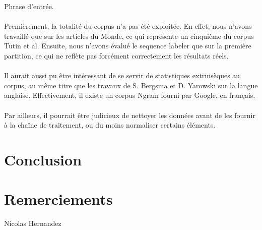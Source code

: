 \documentclass[a4paper,12pt]{article}
\begin{document}
Phrase d'entrée.

\paragraph{}
Premièrement, la totalité du corpus n'a pas été exploitée. En effet, nous n'avons travaillé que sur les articles du Monde, ce qui représente un cinquième du corpus Tutin et al. Ensuite, nous n'avons évalué le sequence labeler que sur la première partition, ce qui ne reflète pas forcément correctement les résultats réels.

\paragraph{}
Il aurait aussi pu être intéressant de se servir de statistiques extrinsèques au corpus, au même titre que les travaux de S. Bergsma et D. Yarowski sur la langue anglaise. Effectivement, il existe un corpus Ngram fourni par Google, en français.

\paragraph{}
Par ailleurs, il pourrait être judicieux de nettoyer les données avant de les fournir à la chaîne de traitement, ou du moins normaliser certains éléments.



\section*{Conclusion}



\section*{Remerciements}

Nicolas Hernandez



\end{document}
